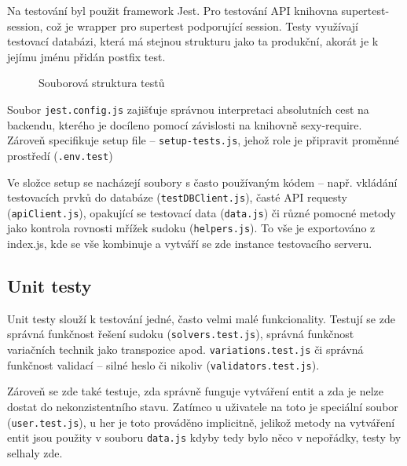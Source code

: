 \documentclass[a4paper,oneside,12pt]{report}
\begin{document}
Na testování byl použit framework Jest. Pro testování API knihovna supertest-session, což je wrapper pro supertest podporující session. Testy využívají testovací databázi, která má stejnou strukturu jako ta produkční, akorát je k jejímu jménu přidán postfix test. 

\begin{figure}[H]
   \caption[Souborová struktura testů]{Souborová struktura testů}
   \label{fig:sqlClasses}
\end{figure}

Soubor \texttt{jest.config.js} zajišťuje správnou interpretaci absolutních cest na backendu, kterého je docíleno pomocí závislosti na knihovně sexy-require. Zároveň specifikuje setup file -- \texttt{setup-tests.js}, jehož role je připravit proměnné prostředí (\texttt{.env.test})

Ve složce setup se nacházejí soubory s často používaným kódem -- např. vkládání testovacích prvků do databáze (\texttt{testDBClient.js}), časté API requesty (\texttt{apiClient.js}), opakující se testovací data (\texttt{data.js}) či různé pomocné metody jako kontrola rovnosti mřížek sudoku (\texttt{helpers.js}). To vše je exportováno z index.js, kde se vše kombinuje a vytváří se zde instance testovacího serveru.

\subsection{Unit testy}
Unit testy slouží k testování jedné, často velmi malé funkcionality. Testují se zde správná funkčnost řešení sudoku (\texttt{solvers.test.js}), správná funkčnost variačních technik jako transpozice apod. \texttt{variations.test.js} či správná funkčnost validací -- silné heslo či nikoliv (\texttt{validators.test.js}). 

Zároveň se zde také testuje, zda správně funguje vytváření entit a zda je nelze dostat do nekonzistentního stavu. Zatímco u uživatele na toto je speciální soubor (\texttt{user.test.js}), u her je toto prováděno implicitně, jelikož metody na vytváření entit jsou použity v souboru \texttt{data.js} kdyby tedy bylo něco v nepořádky, testy by selhaly zde.
\end{document}
